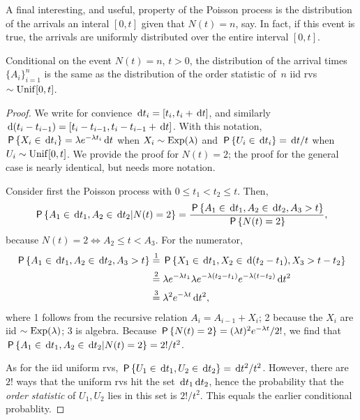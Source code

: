 \documentclass[queueing-book.tex]{subfiles}
\begin{document}
A final interesting, and useful, property of the Poisson process is the distribution of the arrivals an interal $[0,t]$ given that $N(t) = n$, say.
In fact, if this event is true, the arrivals are uniformly distributed over the entire interval $[0,t]$.
\begin{theorem}\label{thr:1}
Conditional on the event $N(t)=n$, $t>0$, the distribution of the arrival times $\{A_{i}\}_{i=1}^{n}$ is the same as the distribution of the order statistic of~$n$ iid rvs $\sim \Unif{[0,t]}$.
\end{theorem}
\begin{proof}
We write for convience $\d t_i = [t_{i}, t_i + \d t]$, and similarly $\d(t_i-t_{i-1}) = [t_i-t_{i-1}, t_i-t_{i-1}+\d t]$. With this notation, $\P{X_i \in \d t_i} = \lambda e^{-\lambda t_i} \d t$ when $X_i\sim \Exp{\lambda}$ and $\P{U_i\in \d t_i } = \d t /t$ when $U_i\sim \Unif{[0,t]}$.
We provide the proof for $N(t)=2$; the proof for the general case is nearly identical, but needs more notation.

Consider first the Poisson process with $0\leq t_1<t_2 \leq  t$. Then,
\begin{align*}
  \P{A_1\in \d t_1, A_2\in \d t_2 | N(t)=2}
= \frac{\P{A_1\in \d t_1, A_2\in \d t_2, A_3 > t}}{\P{N(t)=2}},
\end{align*}
because $N(t) = 2 \iff A_{2} \leq t < A_{3}$.
For the numerator,
\begin{align*}
\P{A_1\in \d t_1, A_2\in \d t_2, A_3 > t}
  &\stackrel1= \P{X_1\in \d t_1, X_2\in \d (t_2-t_1), X_3 > t-t_{2}} \\
  &\stackrel2= \lambda e^{-\lambda t_1} \lambda e^{-\lambda (t_2-t_1)} e^{-\lambda (t-t_2)} \d t^{2}  \\
  &\stackrel3= \lambda^{2} e^{-\lambda t} \d  t^{2},
\end{align*}
where  1 follows from the recursive relation  $A_{i} = A_{i-1} + X_{i}$; 2 because the $X_i$ are iid  $\sim \Exp{\lambda}$; 3 is algebra.
Because $\P{N(t)=2} = (\lambda t)^2 e^{-\lambda t}/2!$, we find that
$ \P{A_1\in \d t_1, A_2\in \d t_2 | N(t)=2} =  2!/t^{2}$.

As for the iid uniform rvs, $\P{U_1\in \d t_1, U_2\in \d t_2} = \d t^2/ t^{2}$.
However, there are $2!$ ways that the uniform rvs hit the set $\d t_1 \d t_{2}$, hence the probability that the \emph{order statistic} of $U_{1}, U_2$ lies in this set is $2!/t^{2}$.
This equals the earlier conditional probablity.
\end{proof}
\end{document}
